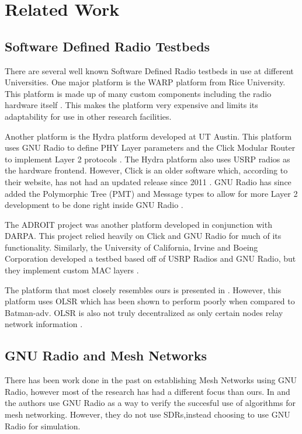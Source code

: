 \section{Related Work}

\subsection{Software Defined Radio Testbeds}

There are several well known Software Defined Radio testbeds in use at different Universities. One major platform is the WARP platform from Rice University. This platform is made up of many custom components including the radio hardware itself \cite{7071706}. This makes the platform very expensive and limits its adaptability for use in other research facilities. 

Another platform is the Hydra platform developed at UT Austin. This platform uses GNU Radio to define PHY Layer parameters and the Click Modular Router to implement Layer 2 protocols \cite{4212821}. The Hydra platform also uses USRP radios as the hardware frontend. However, Click is an older software which, according to their website, has not had an updated release since 2011 \cite{0009}. GNU Radio has since added the Polymorphic Tree (PMT) and Message types to allow for more Layer 2 development to be done right inside GNU Radio \cite{0010}. 

The ADROIT project was another platform developed in conjunction with DARPA. This project relied heavily on Click and GNU Radio for much of its functionality. \cite{4286321}  Similarly, the University of California, Irvine and Boeing Corporation developed a testbed based off of USRP Radios and GNU Radio, but they implement custom MAC layers \cite{4753441}. 

The platform that most closely resembles ours is presented in \cite{0002}. However, this platform uses OLSR which has been shown to perform poorly when compared to Batman-adv. OLSR is also not truly decentralized as only certain nodes relay network information \cite{5375690}. 

\subsection{GNU Radio and Mesh Networks}

There has been work done in the past on establishing Mesh Networks using GNU Radio, however most of the research has had a different focus than ours. In \cite{4509617} and \cite{5062250} the authors use GNU Radio as a way to verify the succesful use of algorithms for mesh networking. However, they do not use SDRs,instead choosing to use GNU Radio for simulation. 

